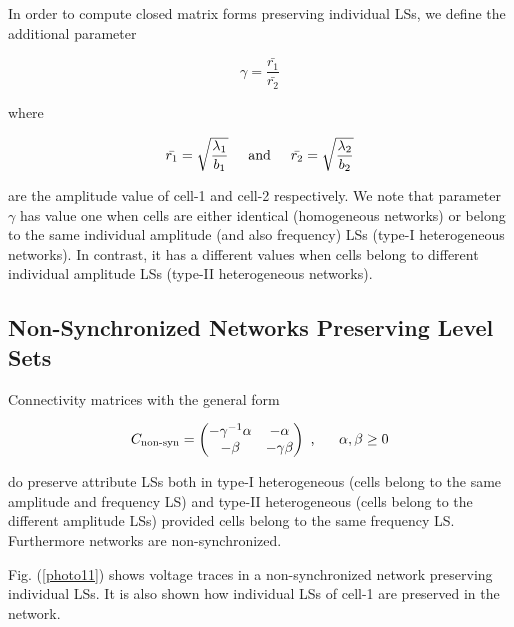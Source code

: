 In order to compute closed matrix forms preserving individual LSs, we define the additional parameter

\begin{equation}
    \gamma = \frac{\bar{r_{1}}}{\bar{r_{2}}}
\end{equation}

where 

\begin{equation}
    \bar{r_{1}} = \sqrt{\frac{\lambda_{1}}{b_{1}}}  \hspace{0.5cm} \text{and} \hspace{0.5cm} \bar{r_{2}} = \sqrt{\frac{\lambda_{2}}{b_{2}}}
    \label{e28}
\end{equation}

are the amplitude value of cell-1 and cell-2 respectively. We note that parameter $\gamma$ has value one when cells are either identical (homogeneous networks) or belong to the same individual amplitude (and also frequency) LSs (type-\textrm{I} heterogeneous networks). In contrast, it has a different values when cells belong to different individual amplitude LSs (type-\textrm{II} heterogeneous networks).

\subsection{Non-Synchronized Networks Preserving Level Sets}
\begin{Statement} 
Connectivity matrices with the general form

\begin{equation}
   C_{\text{non-syn}} = 
    \begin{pmatrix}
        -\gamma^{-1}\alpha & -\alpha\\
        -\beta & -\gamma \beta
    \end{pmatrix}
    \text{ , } \hspace{0.5cm} \alpha, \beta \geq 0
    \label{e30}
\end{equation}

do preserve attribute LSs both in type-\textrm{I} heterogeneous (cells belong to the same amplitude and frequency LS) and type-\textrm{II} heterogeneous (cells belong to the different amplitude LSs) provided cells belong to the same frequency LS.
Furthermore networks are non-synchronized.
\end{Statement} 

Fig. (\ref{photo11}) shows voltage traces in a non-synchronized network preserving individual LSs. It is also shown how individual LSs of cell-1 are preserved in the network.

